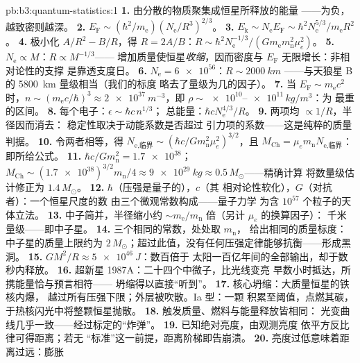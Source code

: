 \begin{solution}{pb:b3:quantum-statistics:1}
\textbf{1.} 由分散的物质聚集成恒星所释放的能量
——为负，越致密则越深。
\textbf{2.} $E_{\text{F}} \sim (\hbar^2/m_{\text{e}})
(N_{\text{e}}/R^3)^{2/3}$。
\textbf{3.} $E_{\text{k}} \sim N_{\text{e}}E_{\text{F}} \sim
\hbar^2N_{\text{e}}^{5/3}/m_{\text{e}}R^2$。
\textbf{4.} 极小化 $A/R^2 - B/R$，得 $R = 2A/B$：$R \sim
\hbar^2N_{\text{e}}^{-1/3}/(Gm_{\text{e}}m_{\text{n}}^2\mu_e^2)$。
\textbf{5.} $N_{\text{e}} \propto M$：$R \propto M^{-1/3}$——
增加质量使恒星\emph{收缩}，因而密度与 $E_{\text{F}}$
无限增长：非相对论性的支撑
是靠透支度日。
\textbf{6.} $N_{\text{e}} = \num{6e56}$：$R \sim \qty{2000}{km}$
——与天狼星 B 的 \qty{5800}{km} 量级相当（我们的标度
略去了量级为几的因子）。
\textbf{7.} 当 $E_{\text{F}} \sim m_{\text{e}}c^2$ 时，$n \sim
(m_{\text{e}}c/\hbar)^3 \approx \qty{2e37}{m^{-3}}$，即 $\rho
\sim \num{e10}$--$\num{e11}\,\unit{kg/m^3}$：为
最重的区间。
\textbf{8.} 每个电子：$\epsilon \sim \hbar c\,n^{1/3}$；
总能量：$\hbar cN_{\text{e}}^{4/3}/R$。
\textbf{9.} 两项均 $\propto 1/R$，半径因而消去：
稳定性取决于动能系数是否超过
引力项的系数——这是纯粹的质量判据。
\textbf{10.} 令两者相等，得 $N_{\text{e,临界}} \sim (\hbar c/
Gm_{\text{n}}^2\mu_e^2)^{3/2}$，且 $M_{\text{Ch}} =
\mu_em_{\text{n}}N_{\text{e,临界}}$：即所给公式。
\textbf{11.} $\hbar c/Gm_{\text{n}}^2 = \num{1.7e38}$；
$M_{\text{Ch}} \sim (\num{1.7e38})^{3/2}m_{\text{n}}/4 \approx
\qty{9e29}{kg} \approx 0.5\,M_\odot$——精确计算
将数量级估计修正为 $1.4\,M_\odot$。
\textbf{12.} $\hbar$（压强是量子的），$c$（其
相对论性软化），$G$（对抗者）：一个恒星尺度的数
由三个微观常数构成——量子力学
为含 $10^{57}$ 个粒子的天体立法。
\textbf{13.} 中子简并，半径缩小约
$\sim m_{\text{e}}/m_{\text{n}}$ 倍（另计 $\mu_e$ 的换算因子）：
千米量级——即中子星。
\textbf{14.} 三个相同的常数，处处取 $m_{\text{n}}$，
给出相同的质量标度：中子星的质量上限约为
$2\,M_\odot$；超过此值，没有任何压强定律能够抗衡——形成黑洞。
\textbf{15.} $GM^2/R \approx \qty{5e46}{J}$：数百倍于
太阳一百亿年间的全部输出，却于数秒内释放。
\textbf{16.} 超新星 1987A：二十四个中微子，比光线变亮
早数小时抵达，所携能量恰与预言相符——
坍缩得以直接“听到”。
\textbf{17.} 核心坍缩：大质量恒星的铁核内爆，
越过所有压强下限；外层被吹散。Ia 型：一颗
积累至阈值，点燃其碳，
于热核闪光中将整颗恒星抛散。
\textbf{18.} 触发质量、燃料与能量释放皆相同：
光变曲线几乎一致——经过标定的“炸弹”。
\textbf{19.} 已知绝对亮度，由观测亮度
依平方反比律可得距离；若无
“标准”这一前提，距离阶梯即告崩溃。
\textbf{20.} 亮度过低意味着距离过远：膨胀

\end{solution}
